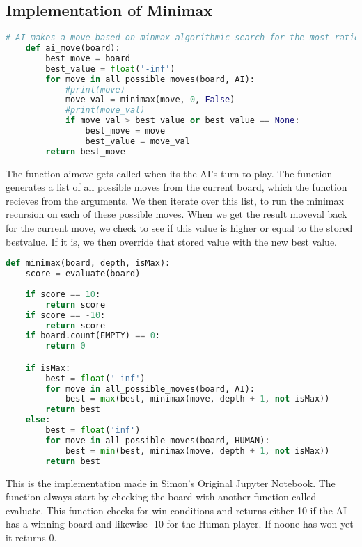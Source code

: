 \subsection{Implementation of Minimax}
\label{subsec:Implementation of Minimax}
\begin{lstlisting}[language=python, caption={python example}, label={Script}, basicstyle=\ttfamily\small]
    # AI makes a move based on minmax algorithmic search for the most rational move to make
    def ai_move(board):
        best_move = board
        best_value = float('-inf')
        for move in all_possible_moves(board, AI):
            #print(move)
            move_val = minimax(move, 0, False)
            #print(move_val)
            if move_val > best_value or best_value == None:
                best_move = move
                best_value = move_val
        return best_move
\end{lstlisting}

The function ai\textunderscore move gets called when its the AI's turn to play. The function generates a list of all possible moves from the current board, 
which the function recieves from the arguments.
We then iterate over this list, to run the minimax recursion on each of these possible moves.
When we get the result move\textunderscore val back for the current move, we check to see if this value is higher or equal to the stored best\textunderscore value. 
If it is, we then override that stored value with the new best value.

\begin{lstlisting}[language=python, caption={python example}, label={Script}, basicstyle=\ttfamily\small]
    def minimax(board, depth, isMax):
    score = evaluate(board)
    
    if score == 10: 
        return score
    if score == -10:
        return score
    if board.count(EMPTY) == 0:
        return 0

    if isMax:
        best = float('-inf')
        for move in all_possible_moves(board, AI):
            best = max(best, minimax(move, depth + 1, not isMax))
        return best
    else:
        best = float('inf')
        for move in all_possible_moves(board, HUMAN):
            best = min(best, minimax(move, depth + 1, not isMax))
        return best
\end{lstlisting}

This is the implementation made in Simon's Original Jupyter Notebook. 
The function always start by checking the board with another function called evaluate. 
This function checks for win conditions and returns either 10 if the AI has a winning board and likewise -10 for the Human player.
If noone has won yet it returns 0.

